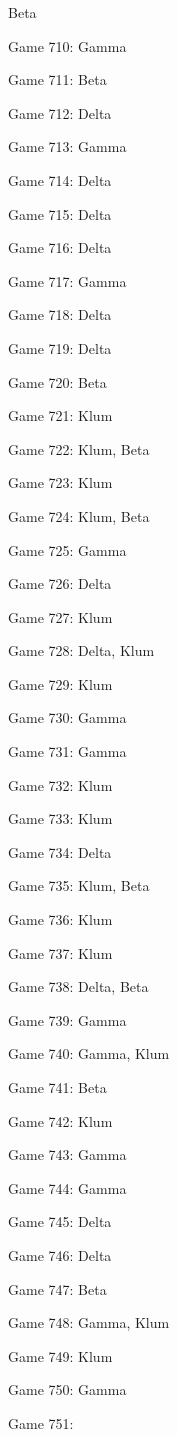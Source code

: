 \documentclass{article}
\begin{document}
\begin{multicols}{3}
\begin{compactitem}
Beta
\item Game 710:
Gamma
\item Game 711:
Beta
\item Game 712:
Delta
\item Game 713:
Gamma
\item Game 714:
Delta
\item Game 715:
Delta
\item Game 716:
Delta
\item Game 717:
Gamma
\item Game 718:
Delta
\item Game 719:
Delta
\item Game 720:
Beta
\item Game 721:
Klum
\item Game 722:
Klum, Beta
\item Game 723:
Klum
\item Game 724:
Klum, Beta
\item Game 725:
Gamma
\item Game 726:
Delta
\item Game 727:
Klum
\item Game 728:
Delta, Klum
\item Game 729:
Klum
\item Game 730:
Gamma
\item Game 731:
Gamma
\item Game 732:
Klum
\item Game 733:
Klum
\item Game 734:
Delta
\item Game 735:
Klum, Beta
\item Game 736:
Klum
\item Game 737:
Klum
\item Game 738:
Delta, Beta
\item Game 739:
Gamma
\item Game 740:
Gamma, Klum
\item Game 741:
Beta
\item Game 742:
Klum
\item Game 743:
Gamma
\item Game 744:
Gamma
\item Game 745:
Delta
\item Game 746:
Delta
\item Game 747:
Beta
\item Game 748:
Gamma, Klum
\item Game 749:
Klum
\item Game 750:
Gamma
\item Game 751:

\end{compactitem}
\end{multicols}
\end{document}
